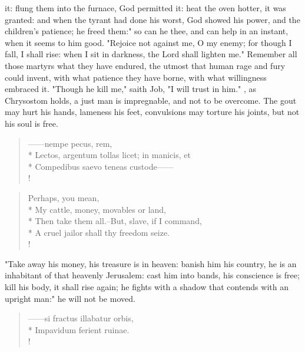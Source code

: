 {it: flung them into the furnace, God permitted it: heat the oven hotter, it was granted: and when the tyrant had done his worst, God showed his power, and the children's patience; he freed them:" so can he thee, and can help in an instant, when it seems to him good. "Rejoice not against me, O my enemy; for though I fall, I shall rise: when I sit in darkness, the Lord shall lighten me." Remember all those martyrs what they have endured, the utmost that human rage and fury could invent, with what patience they have borne, with what willingness embraced it. "Though he kill me," saith Job, "I will trust in him." , as Chrysostom holds, a just man is impregnable, and not to be overcome. The gout may hurt his hands, lameness his feet, convulsions may torture his joints, but not  his soul is free.

\begin{latin}
\begin{verse}%
------nempe pecus, rem,\\*
Lectos, argentum tollas licet; in manicis, et\\*
Compedibus saevo teneas custode------\\!
\end{verse}%
\end{latin}



\begin{verse}%
Perhaps, you mean,\\*
My cattle, money, movables or land,\\*
Then take them all.--But, slave, if I command,\\*
A cruel jailor shall thy freedom seize.\\!
\end{verse}%

"Take away his money, his treasure is in heaven: banish him his country, he is an inhabitant of that heavenly Jerusalem: cast him into bands, his conscience is free; kill his body, it shall rise again; he fights with a shadow that contends with an upright man:" he will not be moved.

\begin{latin}
\begin{verse}%
------si fractus illabatur orbis,\\*
Impavidum ferient ruinae.\\!
\end{verse}%
\end{latin}

}
